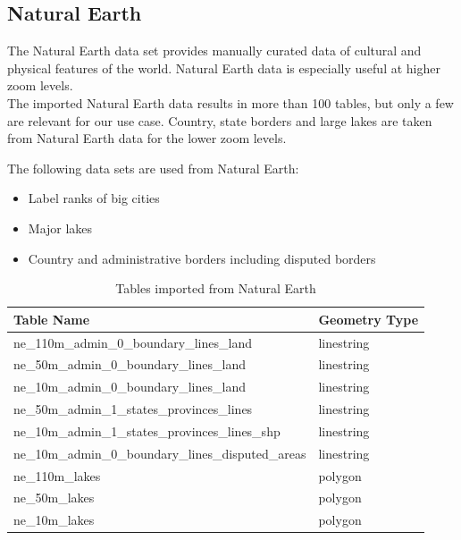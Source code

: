 \newpage
\subsection{Natural Earth}

The Natural Earth \cite{16_naturalearthdata.com_2015} data set provides manually curated data of cultural and physical features of the world. Natural Earth data is especially useful at higher zoom levels.
\\
The imported Natural Earth data results in more than 100 tables, but only a few
are relevant for our use case. Country, state borders and large lakes are taken from Natural Earth data for the lower zoom levels.

The following data sets are used from Natural Earth:

\begin{itemize}
\item Label ranks of big cities\cite{17_naturalearthdata.com_2015}
\item Major lakes\cite{18_naturalearthdata.com_2015}
\item Country\cite{19_naturalearthdata.com_2015} and administrative\cite{20_naturalearthdata.com_2015} borders including disputed borders\cite{21_naturalearthdata.com_2015}
\end{itemize}



\begin{table}[H]
\centering
    \begin{tabular}{ll}
    \hline
    Table Name                                          & Geometry Type \\
    \hline
    ne\_110m\_admin\_0\_boundary\_lines\_land           & linestring    \\
    ne\_50m\_admin\_0\_boundary\_lines\_land            & linestring    \\
    ne\_10m\_admin\_0\_boundary\_lines\_land            & linestring    \\
    ne\_50m\_admin\_1\_states\_provinces\_lines         & linestring    \\
    ne\_10m\_admin\_1\_states\_provinces\_lines\_shp    & linestring    \\
    ne\_10m\_admin\_0\_boundary\_lines\_disputed\_areas & linestring    \\
    ne\_110m\_lakes                                     & polygon       \\
    ne\_50m\_lakes                                      & polygon       \\
    ne\_10m\_lakes                                      & polygon       \\
    \end{tabular}
    \caption{Tables imported from Natural Earth}
\end{table}

